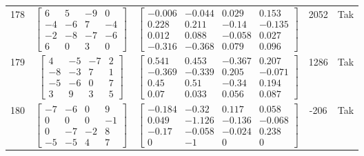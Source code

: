 \documentclass[a4paper,12pt]{article}
\begin{document}
\begin{tabular}{c c c c c}
178
&
$\begin{bmatrix} 6 & 5 & -9 & 0 \\ -4 & -6 & 7 & -4 \\ -2 & -8 & -7 & -6 \\ 6 & 0 & 3 & 0 \end{bmatrix}$
&
$\begin{bmatrix} -0.006 & -0.044 & 0.029 & 0.153 \\ 0.228 & 0.211 & -0.14 & -0.135 \\ 0.012 & 0.088 & -0.058 & 0.027 \\ -0.316 & -0.368 & 0.079 & 0.096 \end{bmatrix}$
&
2052
&
Tak
\\
179
&
$\begin{bmatrix} 4 & -5 & -7 & 2 \\ -8 & -3 & 7 & 1 \\ -5 & -6 & 0 & 7 \\ 3 & 9 & 3 & 5 \end{bmatrix}$
&
$\begin{bmatrix} 0.541 & 0.453 & -0.367 & 0.207 \\ -0.369 & -0.339 & 0.205 & -0.071 \\ 0.45 & 0.51 & -0.34 & 0.194 \\ 0.07 & 0.033 & 0.056 & 0.087 \end{bmatrix}$
&
1286
&
Tak
\\
180
&
$\begin{bmatrix} -7 & -6 & 0 & 9 \\ 0 & 0 & 0 & -1 \\ 0 & -7 & -2 & 8 \\ -5 & -5 & 4 & 7 \end{bmatrix}$
&
$\begin{bmatrix} -0.184 & -0.32 & 0.117 & 0.058 \\ 0.049 & -1.126 & -0.136 & -0.068 \\ -0.17 & -0.058 & -0.024 & 0.238 \\ 0 & -1 & 0 & 0 \end{bmatrix}$
&
-206
&
Tak
\\
\end{tabular} \egroup \newpage
\end{document}
